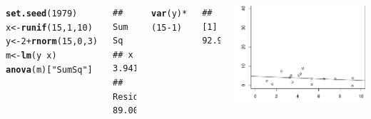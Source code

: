 \documentclass{beamer}\usepackage[]{graphicx}\usepackage[]{color}
\makeatletter
\newcommand{\hlnum}[1]{\textcolor[rgb]{0.686,0.059,0.569}{#1}}%
\newcommand{\hlstr}[1]{\textcolor[rgb]{0.192,0.494,0.8}{#1}}%
\newcommand{\hlopt}[1]{\textcolor[rgb]{0,0,0}{#1}}%
\newcommand{\hlstd}[1]{\textcolor[rgb]{0.345,0.345,0.345}{#1}}%
\newcommand{\hlkwb}[1]{\textcolor[rgb]{0.69,0.353,0.396}{#1}}%
\newcommand{\hlkwd}[1]{\textcolor[rgb]{0.737,0.353,0.396}{\textbf{#1}}}%
\newenvironment{kframe}{%
 \def\at@end@of@kframe{}%
 \ifinner\ifhmode%
  \def\at@end@of@kframe{\end{minipage}}%
  \begin{minipage}{\columnwidth}%
 \fi\fi%
 \def\FrameCommand##1{\hskip\@totalleftmargin \hskip-\fboxsep
 \colorbox{shadecolor}{##1}\hskip-\fboxsep
     \hskip-\linewidth \hskip-\@totalleftmargin \hskip\columnwidth}%
 \MakeFramed {\advance\hsize-\width
   \@totalleftmargin\z@ \linewidth\hsize
   \@setminipage}}%
 {\par\unskip\endMakeFramed%
 \at@end@of@kframe}
\newenvironment{knitrout}{}{} %
\renewenvironment{knitrout}{\setlength{\topsep}{0mm}}{}
\makeatother
\begin{document}
\begin{frame}[fragile]
\begin{columns}[c]

\begin{knitrout}\tiny
{}\color{fgcolor}\begin{kframe}
\begin{alltt}
\hlkwd{set.seed}\hlstd{(}\hlnum{1979}\hlstd{)}
\hlstd{x} \hlkwb{<-} \hlkwd{runif}\hlstd{(}\hlnum{15}\hlstd{,}\hlnum{1}\hlstd{,}\hlnum{10}\hlstd{)}
\hlstd{y} \hlkwb{<-} \hlnum{2} \hlopt{+} \hlkwd{rnorm}\hlstd{(}\hlnum{15}\hlstd{,}\hlnum{0}\hlstd{,}\hlnum{3}\hlstd{)}
\hlstd{m} \hlkwb{<-} \hlkwd{lm}\hlstd{(y} \hlopt{~} \hlstd{x)}
\hlkwd{anova}\hlstd{(m)[}\hlstr{"Sum Sq"}\hlstd{]}
\end{alltt}
\begin{verbatim}
##           Sum Sq
## x          3.941
## Residuals 89.006
\end{verbatim}
\begin{alltt}
\hlkwd{var}\hlstd{(y)}\hlopt{*}\hlstd{(}\hlnum{15}\hlopt{-}\hlnum{1}\hlstd{)}
\end{alltt}
\begin{verbatim}
## [1] 92.94772
\end{verbatim}
\end{kframe}
\end{knitrout}

\begin{knitrout}\tiny
{}\color{fgcolor}
\includegraphics[width=0.7\linewidth]{figure/ssr0plot-1} 

\end{knitrout}

\end{columns}

\end{frame}
\end{document}
